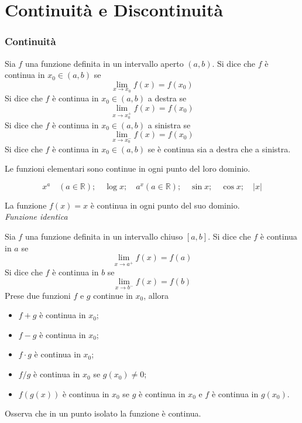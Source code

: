 \documentclass{article}
\begin{document}
\part{Continuità e Discontinuità}
\section*{Continuità}
Sia $f$ una funzione definita in un intervallo aperto $(a,b)$.
Si dice che $f$ è continua in $x_0\in(a,b)$ se
\[
    \lim_{x\to x_0}f(x) = f(x_0)
\]
Si dice che $f$ è continua in $x_0\in(a,b)$ a destra se
\[
    \lim_{x\to x_0^+}f(x) = f(x_0)
\]
Si dice che $f$ è continua in $x_0\in(a,b)$ a sinistra se
\[
    \lim_{x\to x_0^-}f(x) = f(x_0)
\]
Si dice che $f$ è continua in $x_0\in(a,b)$ se è continua sia a destra che a
sinistra.

\begin{esbox}
    Le funzioni elementari sono continue in ogni punto del loro dominio.
\end{esbox}
\[
    x^a\quad (a\in\mathbb{R});\quad \log x;\quad a^x (a\in\mathbb{R});\quad \sin x;\quad \cos x;\quad |x|
\]
\begin{esbox}
    La funzione $f(x)=x$ è continua in ogni punto del suo dominio.\\ \textit{Funzione identica}
\end{esbox}
Sia $f$ una funzione definita in un intervallo chiuso $[a,b]$.
Si dice che $f$ è continua in $a$ se
\[
    \lim_{x\to a^+}f(x) = f(a)
\]
Si dice che $f$ è continua in $b$ se
\[
    \lim_{x\to b^-}f(x) = f(b)
\]
Prese due funzioni $f$ e $g$ continue in $x_0$, allora
\begin{itemize}
    \item $f+g$ è continua in $x_0$;
    \item $f-g$ è continua in $x_0$;
    \item $f\cdot g$ è continua in $x_0$;
    \item $f/g$ è continua in $x_0$ se $g(x_0)\neq 0$;
    \item $f(g(x))$ è continua in $x_0$ se $g$ è continua in $x_0$ e $f$ è continua in $g(x_0)$.
\end{itemize}
Osserva che in un punto isolato la funzione è continua.\\
\end{document}

